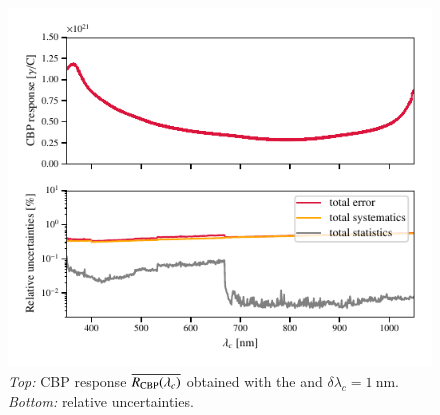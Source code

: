 \begin{figure}[h]
    \centering
    \includegraphics[width=\columnwidth]{fig/cbp_response.pdf}
    \caption{\textit{Top:} CBP response $\overline{R_{\mathrm{CBP}}(\lambda_c)}$ obtained with the \bpinhole and $\delta \lambda_c = \SI{1}{\nano\meter}$. \textit{Bottom:} relative uncertainties.}
    \label{fig:cbp_response}
\end{figure}